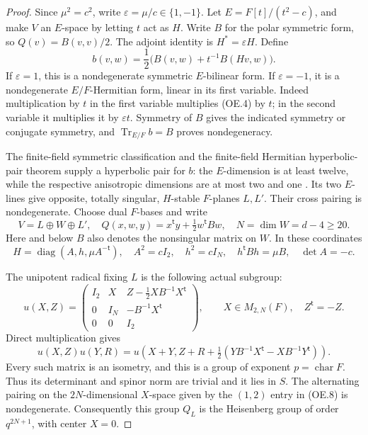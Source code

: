 \begin{proof}
Since $\mu^2=c^2$, write $\varepsilon=\mu/c\in\{1,-1\}$.
Let $E=F[t]/(t^2-c)$, and make $V$ an $E$-space by letting $t$
act as $H$.  Write $B$ for the polar symmetric form, so
$Q(v)=B(v,v)/2$.  The adjoint identity is $H^*=\varepsilon H$.
Define
\[
 b(v,w)=\frac12\bigl(B(v,w)+t^{-1}B(Hv,w)\bigr).
 \tag{OE.4}
\]
If $\varepsilon=1$, this is a nondegenerate symmetric $E$-bilinear
form.  If $\varepsilon=-1$, it is a nondegenerate $E/F$-Hermitian
form, linear in its first variable.  Indeed multiplication by $t$
in the first variable multiplies (OE.4) by $t$; in the second
variable it multiplies it by $\varepsilon t$.  Symmetry of $B$
gives the indicated symmetry or conjugate symmetry, and
$\operatorname{Tr}_{E/F}b=B$ proves nondegeneracy.

The finite-field symmetric classification and the finite-field
Hermitian hyperbolic-pair theorem supply a hyperbolic pair for $b$:
the $E$-dimension is at least twelve, while the respective
anisotropic dimensions are at most two and one
\cite[pp.~138--140; Lemma~10.2, Corollary~10.3 and the ensuing
decomposition, pp.~116--117]{OS:Taylor1992}.
Its two $E$-lines give opposite, totally singular, $H$-stable
$F$-planes $L,L'$.  Their cross pairing is nondegenerate.  Choose
dual $F$-bases and write
\[
 V=L\oplus W\oplus L',\quad
 Q(x,w,y)=x^{\mathsf t}y+\tfrac12w^{\mathsf t}Bw,
 \quad N=\dim W=d-4\ge20.
 \tag{OE.5}
\]
Here and below $B$ also denotes the nonsingular matrix on $W$.
In these coordinates
\[
 H=\operatorname{diag}(A,h,\mu A^{-\mathsf t}),\quad
 A^2=cI_2,\quad h^2=cI_N,\quad
 h^{\mathsf t}Bh=\mu B,\quad\det A=-c.
 \tag{OE.6}
\]

The unipotent radical fixing $L$ is the following actual subgroup:
\[
 u(X,Z)=
 \begin{pmatrix}
 I_2&X&Z-\tfrac12XB^{-1}X^{\mathsf t}\\
 0&I_N&-B^{-1}X^{\mathsf t}\\
 0&0&I_2
 \end{pmatrix},\qquad
 X\in M_{2,N}(F),\quad Z^{\mathsf t}=-Z.
 \tag{OE.7}
\]
Direct multiplication gives
\[
 u(X,Z)u(Y,R)=u\left(X+Y,
 Z+R+\tfrac12(YB^{-1}X^{\mathsf t}-XB^{-1}Y^{\mathsf t})\right).
 \tag{OE.8}
\]
Every such matrix is an isometry, and this is a group of exponent
$p=\operatorname{char}F$.  Thus its determinant and spinor norm
are trivial and it lies in $S$.  The alternating pairing on the
$2N$-dimensional $X$-space given by the $(1,2)$ entry in (OE.8)
is nondegenerate.  Consequently this group $Q_L$ is the Heisenberg
group of order $q^{2N+1}$, with center $X=0$.


\end{proof}

